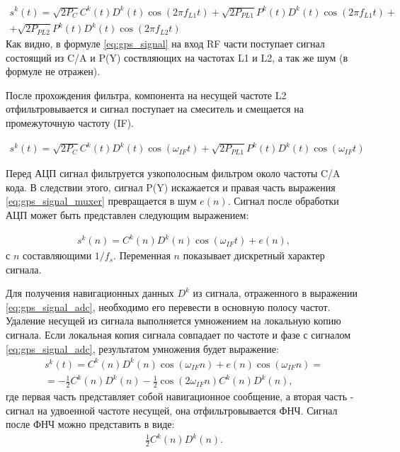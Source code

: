 \begin{eqnarray}
s^k(t) =	\sqrt{2P_C} C^k(t) D^k(t) \cos(2 \pi f_{L1} t) +
		\sqrt{2P_{PL1}} P^k(t) D^k(t) \cos(2 \pi f_{L1} t) + \nonumber \\
		+ \sqrt{2P_{PL2}} P^k(t) D^k(t) \cos(2 \pi f_{L2} t)
\label{eq:gps_signal}
\end{eqnarray}
Как видно, в формуле \ref{eq:gps_signal} на вход RF части поступает сигнал состоящий из C/A и P(Y) 
соствляющих на частотах L1 и L2, а так же шум (в формуле не отражен).

После прохождения фильтра, компонента на несущей частоте L2 отфильтровывается и сигнал поступает на смеситель и смещается на
промежуточную частоту (IF).

\begin{eqnarray}
s^k(t) =	\sqrt{2P_C} C^k(t) D^k(t) \cos(\omega_{IF} t) +
		\sqrt{2P_{PL1}} P^k(t) D^k(t) \cos(\omega_{IF} t)
\label{eq:gps_signal_muxer}
\end{eqnarray}

Перед АЦП сигнал фильтруется узкополосным фильтром около частоты C/A кода. В следствии этого, сигнал P(Y) искажается и правая часть
выражения \ref{eq:gps_signal_muxer} превращается в шум ${e(n)}$. Сигнал после обработки АЦП может быть представлен следующим
выражением:

\begin{eqnarray}
s^k(n) =	C^k(n) D^k(n) \cos(\omega_{IF} t) + e(n),
\label{eq:gps_signal_adc}
\end{eqnarray}
с ${n}$ составляющими ${1/f_s}$. Переменная ${n}$ показывает дискретный характер сигнала.

Для получения навигационных данных ${D^k}$ из сигнала, отраженного в выражении \ref{eq:gps_signal_adc}, необходимо его 
перевести в основную полосу частот. Удаление несущей из сигнала выполняется умножением на локальную копию сигнала.
Если локальная копия сигнала совпадает по частоте и фазе с сигналом \ref{eq:gps_signal_adc}, результатом умножения 
будет выражение:
\begin{eqnarray}
s^k(t)	=	C^k(n) D^k(n) \cos(\omega_{IF} n) + e(n) \cos(\omega_{IF} n) = \nonumber \\
	=	-\frac{1}{2}C^k(n) D^k(n) - \frac{1}{2}\cos(2\omega_{IF} n)C^k(n) D^k(n),
\label{eq:gps_signal_lpf}
\end{eqnarray}
где первая часть представляет собой навигационное сообщение, а вторая часть - сигнал на удвоенной частоте несущей, она
отфильтровывается ФНЧ. Сигнал после ФНЧ можно представить в виде:
\begin{eqnarray}
\frac{1}{2}C^k(n) D^k(n).
\end{eqnarray}

